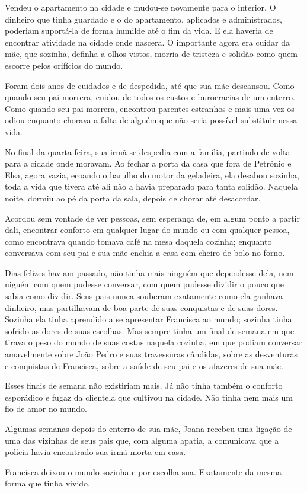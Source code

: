 \documentclass[11pt,a4paper,twoside,openany]{book}
\begin{document}
Vendeu o apartamento na cidade e mudou-se novamente para o interior. O dinheiro que tinha guardado e o do apartamento, aplicados e administrados, poderiam suportá-la de forma humilde até o fim da vida. E ela haveria de encontrar atividade na cidade onde nascera. O importante agora era cuidar da mãe, que sozinha, definha a olhos vistos, morria de tristeza e solidão como quem escorre pelos orifícios do mundo.

Foram dois anos de cuidados e de despedida, até que sua mãe descansou. Como quando seu pai morrera, cuidou de todos os custos e burocracias de um enterro. Como quando seu pai morrera, encontrou parentes-estranhos e mais uma vez os odiou enquanto chorava a falta de alguém que não seria possível substituir nessa vida.

No final da quarta-feira, sua irmã se despedia com a família, partindo de volta para a cidade onde moravam. Ao fechar a porta da casa que fora de Petrônio e Elsa, agora vazia, ecoando o barulho do motor da geladeira, ela desabou sozinha, toda a vida que tivera até ali não a havia preparado para tanta solidão. Naquela noite, dormiu ao pé da porta da sala, depois de chorar até desacordar.

Acordou sem vontade de ver pessoas, sem esperança de, em algum ponto a partir dali, encontrar conforto em qualquer lugar do mundo ou com qualquer pessoa, como encontrava quando tomava café na mesa daquela cozinha; enquanto conversava com seu pai e sua mãe enchia a casa com cheiro de bolo no forno.

Dias felizes haviam passado, não tinha mais ninguém que dependesse dela, nem niguém com quem pudesse conversar, com quem pudesse dividir o pouco que sabia como dividir. Seus pais nunca souberam exatamente como ela ganhava dinheiro, mas partilhavam de boa parte de suas conquistas e de suas dores. Sozinha ela tinha aprendido a se apresentar Francisca ao mundo; sozinha tinha sofrido as dores de suas escolhas. Mas sempre tinha um final de semana em que tirava o peso do mundo de suas costas naquela cozinha, em que podiam conversar amavelmente sobre João Pedro e suas travessuras cândidas, sobre as desventuras e conquistas de Francisca, sobre a saúde de seu pai e os afazeres de sua mãe.

Esses finais de semana não existiriam mais. Já não tinha também o conforto esporádico e fugaz da clientela que cultivou na cidade. Não tinha nem mais um fio de amor no mundo.

Algumas semanas depois do enterro de sua mãe, Joana recebeu uma ligação de uma das vizinhas de seus pais que, com alguma apatia, a comunicava que a polícia havia encontrado sua irmã morta em casa.

Francisca deixou o mundo sozinha e por escolha sua. Exatamente da mesma forma que tinha vivido.
\end{document}
